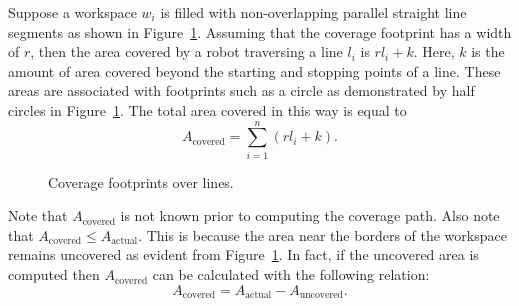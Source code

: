 \documentclass[../main.tex]{subfiles}
\begin{document}
Suppose a workspace $w_i$ is filled with non-overlapping parallel straight line segments as shown in Figure~\ref{fig:line_footprint}. Assuming that the coverage footprint has a width of $r$, then the area covered by a robot traversing a line $l_i$ is $rl_i+k$. Here, $k$ is the amount of area covered beyond the starting and stopping points of a line. These areas are associated with footprints such as a circle as demonstrated by half circles in Figure~\ref{fig:line_footprint}. The total area covered in this way is equal to
\begin{equation}
	\label{eq:covered_area}
	A_{\text{covered}} = \sum_{i=1}^n(rl_i+k).
\end{equation}

\begin{figure}
	\centering
	
	\caption{Coverage footprints over lines.}
	\label{fig:line_footprint}
\end{figure}

\begin{remark}
Note that $A_{\text{covered}}$ is not known prior to computing the coverage path. Also note that $A_{\text{covered}}\leq A_{\text{actual}}$. This is because the area near the borders of the workspace remains uncovered as evident from Figure~\ref{fig:line_footprint}. In fact, if the uncovered area is computed then $A_{\text{covered}}$ can be calculated with the following relation:
	\begin{equation}
		A_{\text{covered}}=A_{\text{actual}}-A_{\text{uncovered}}.
	\end{equation}\RE
\end{remark}
\end{document}
